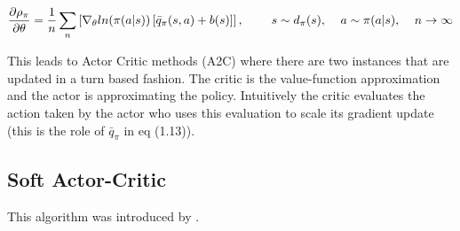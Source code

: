 \begin{align}
\frac{\partial\rho_\pi}{\partial\theta} = \frac{1}{n}\sum_{n} \left[ \nabla_\theta ln (\pi(a|s))\left[ \bar{q}_\pi(s,a)+b(s)\right]\right],\text{\hspace{8mm}} s\sim d_\pi(s), \text{\hspace{4mm}} a\sim \pi(a|s), \text{\hspace{4mm}} n\rightarrow\infty
\end{align}

This leads to Actor Critic methods (A2C) where there are two instances that are updated in a turn based fashion. The critic is the value-function approximation and the actor is approximating the policy. Intuitively the critic evaluates the action taken by the actor who uses this evaluation to scale its gradient update (this is the role of $\bar{q}_\pi$ in eq (1.13)).

\subsection{Soft Actor-Critic}
This algorithm was introduced by \cite{haarnoja2018soft}.
